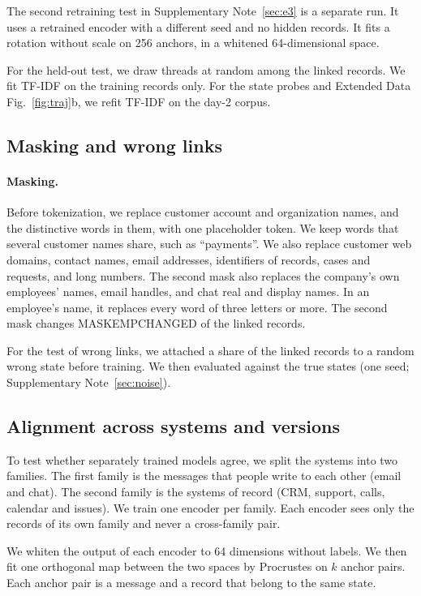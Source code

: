 \documentclass[11pt]{article}
\begin{document}
The second retraining test in Supplementary Note~\ref{sec:e3} is a separate run. It uses a retrained encoder with a different seed and no hidden records. It fits a rotation without scale on 256 anchors, in a whitened 64-dimensional space.

For the held-out test, we draw threads at random among the linked records. We fit TF-IDF on the training records only. For the state probes and Extended Data Fig.~\ref{fig:traj}b, we refit TF-IDF on the day-2 corpus.

\subsection{Masking and wrong links}
\paragraph{Masking.} Before tokenization, we replace customer account and organization names, and the distinctive words in them, with one placeholder token. We keep words that several customer names share, such as ``payments''. We also replace customer web domains, contact names, email addresses, identifiers of records, cases and requests, and long numbers. The second mask also replaces the company's own employees' names, email handles, and chat real and display names. In an employee's name, it replaces every word of three letters or more. The second mask changes MASKEMPCHANGED of the linked records.

For the test of wrong links, we attached a share of the linked records to a random wrong state before training. We then evaluated against the true states (one seed; Supplementary Note~\ref{sec:noise}).

\subsection{Alignment across systems and versions}
To test whether separately trained models agree, we split the systems into two families. The first family is the messages that people write to each other (email and chat). The second family is the systems of record (CRM, support, calls, calendar and issues). We train one encoder per family. Each encoder sees only the records of its own family and never a cross-family pair.

We whiten the output of each encoder to 64 dimensions without labels. We then fit one orthogonal map between the two spaces by Procrustes on $k$ anchor pairs. Each anchor pair is a message and a record that belong to the same state.
\end{document}
